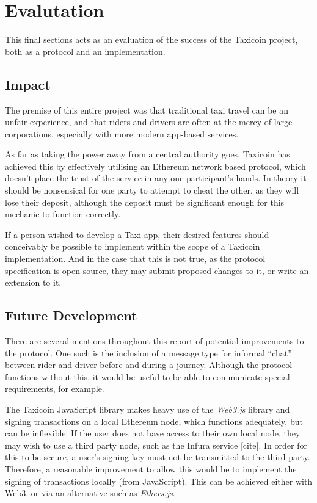\section{Evalutation}

This final sections acts as an evaluation of the success of the Taxicoin project, both as a protocol and an implementation.

\subsection{Impact}

The premise of this entire project was that traditional taxi travel can be an unfair experience, and that riders and drivers are often at the mercy of large corporations, especially with more modern app-based services.

As far as taking the power away from a central authority goes, Taxicoin has achieved this by effectively utilising an Ethereum network based protocol, which doesn't place the trust of the service in any one participant's hands. In theory it should be nonsensical for one party to attempt to cheat the other, as they will lose their deposit, although the deposit must be significant enough for this mechanic to function correctly.

If a person wished to develop a Taxi app, their desired features should conceivably be possible to implement within the scope of a Taxicoin implementation. And in the case that this is not true, as the protocol specification is open source, they may submit proposed changes to it, or write an extension to it.

\subsection{Future Development}

There are several mentions throughout this report of potential improvements to the protocol. One such is the inclusion of a message type for informal \enquote{chat} between rider and driver before and during a journey. Although the protocol functions without this, it would be useful to be able to communicate special requirements, for example.

The Taxicoin JavaScript library makes heavy use of the \textit{Web3.js} library and signing transactions on a local Ethereum node, which functions adequately, but can be inflexible. If the user does not have access to their own local node, they may wish to use a third party node, such as the Infura service [cite]. In order for this to be secure, a user's signing key must not be transmitted to the third party. Therefore, a reasonable improvement to allow this would be to implement the signing of transactions locally (from JavaScript). This can be achieved either with Web3, or via an alternative such as \textit{Ethers.js}.

